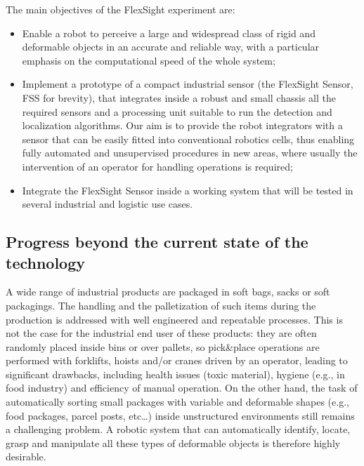 The main objectives of the FlexSight experiment are:

\begin{itemize}
	\item Enable a robot to perceive a large and widespread class of rigid and deformable objects in an accurate and reliable way, with a particular emphasis on the computational speed of the whole system;
	\item Implement a prototype of a compact industrial sensor (the FlexSight Sensor, FSS for brevity), that integrates inside a robust and small chassis all the required sensors and a processing unit suitable to run the detection and localization algorithms. Our aim is to provide the robot integrators with a sensor that can be easily fitted into conventional robotics cells, thus enabling fully automated and unsupervised procedures in new areas, where usually the intervention of an operator for handling operations is required;
	\item Integrate the FlexSight Sensor inside a working system that will be tested in several industrial and logistic use cases.
\end{itemize}

\subsection{Progress beyond the current state of the technology}\label{subsec:flexsight_related_works}
A wide range of industrial products are packaged in soft bags, sacks or soft packagings. The handling and the palletization of such items during the production is addressed with well engineered and repeatable processes. This is not the case for the industrial end user of these products: they are often randomly placed inside bins or over pallets, so pick\&place operations are performed with forklifts, hoists and/or cranes driven by an operator, leading to significant drawbacks, including health issues (toxic material), hygiene (e.g., in food industry) and efficiency of manual operation. On the other hand, the task of automatically sorting small packages with variable and deformable shapes (e.g., food packages, parcel posts, etc…) inside unstructured environments still remains a challenging problem. A robotic system that can automatically identify, locate, grasp and manipulate all these types of deformable objects is therefore highly desirable.

